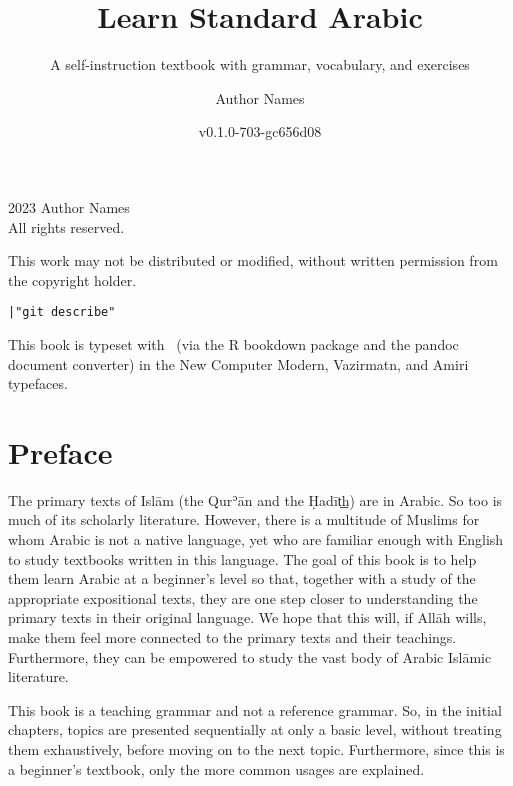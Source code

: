 \documentclass[
  10pt,
]{book}
\title{Learn Standard Arabic}
\subtitle{A self-instruction textbook with grammar, vocabulary, and exercises}
\author{Author Names}
\date{v0.1.0-703-gc656d08}
\newcommand{\gitTag}{|"git describe"}
\renewcommand{\foreignlanguage}[2]{\oldforeignlanguage{#1}{\smash{#2}}}
\begin{document}
\maketitle

\thispagestyle{empty}
\begingroup
\footnotesize
\parindent 0pt
\parskip \baselineskip
\textcopyright{} 2023 Author Names \\
All rights reserved.

    This work may not be distributed or modified, without written permission from the copyright holder.

\texttt{\gitTag}

This book is typeset with \XeLaTeX\ (via the R bookdown package and the pandoc document converter)
in the New Computer Modern, Vazirmatn, and Amiri typefaces.


\vfill




\endgroup
\clearpage

{
\setcounter{tocdepth}{1}
\tableofcontents
}
\chapter*{Preface}\label{preface}


\foreignlanguage{arabic}{بسم الله الرحمن الرحيم}

The primary texts of Islām (the Qurʾān and the Ḥadīt͟h) are in Arabic. So too is much of its scholarly literature. However, there is a multitude of Muslims for whom Arabic is not a native language, yet who are familiar enough with English to study textbooks written in this language. The goal of this book is to help them learn Arabic at a beginner's level so that, together with a study of the appropriate expositional texts, they are one step closer to understanding the primary texts in their original language. We hope that this will, if Allāh wills, make them feel more connected to the primary texts and their teachings. Furthermore, they can be empowered to study the vast body of Arabic Islāmic literature.

This book is a teaching grammar and not a reference grammar. So, in the initial chapters, topics are presented sequentially at only a basic level, without treating them exhaustively, before moving on to the next topic. Furthermore, since this is a beginner's textbook, only the more common usages are explained.
\end{document}
